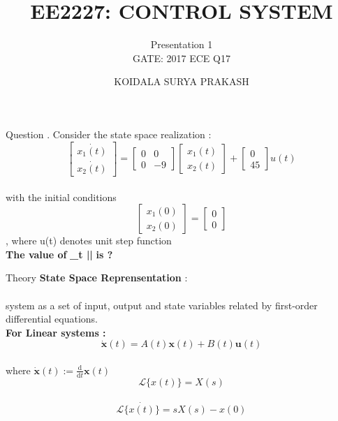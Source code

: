 \documentclass{beamer}
\title[ShortTitle]{EE2227: CONTROL SYSTEM}
\subtitle{Presentation 1 \\ GATE: 2017 ECE Q17 }\\
\author{KOIDALA SURYA PRAKASH}
\institute{EE18BTECH11026}
\date{\tomorrow}
\begin{document}
\begin{frame}
  \titlepage
\end{frame}

\begin{frame}{Question}
  \Q. Consider the state space realization : \vspace{2mm}\\
 $$\left[\begin{array}{l}
\dot{x_{1}(t)} \\
\dot{x_{2}(t)}
\end{array}\right]=\left[\begin{array}{cc}
{0} & {0} \\
{0} & {-9}
\end{array}\right]\left[\begin{array}{l}
{x_{1}(t)} \\
{x_{2}(t)}
\end{array}\right]+\left[\begin{array}{c}
{0} \\
{45}
\end{array}\right] u(t)$$ \smallskip  \\
with the initial conditions $$\left[\begin{array}{l}
{x_{1}(0)} \\
{x_{2}(0)}
\end{array}\right]=\left[\begin{array}{l}
{0} \\
{0}
\end{array}\right] $$, where u(t) denotes unit step function  \vspace{2mm} \\
\textbf { The value of } \textbf{\lim _{t \rightarrow \infty}||} \textbf { is ? }

\end{frame}


\begin{frame}{Theory}
\textbf{State Space Reprensentation} : \\
\\system as a set of input, output and state variables related by first-order differential equations.
\\\textbf{For Linear systems : }
\\$$\dot{\mathbf{x}}(t)=A(t) \mathbf{x}(t)+B(t) \mathbf{u}(t)$$
\\ where $\dot{\mathbf{x}}(t):=\frac{\mathrm{d}}{\mathrm{d} t} \mathbf{x}(t)$
\\$$\mathscr{L}\{x(t)\}=X(s)$$
\\$$\mathscr{L}\{\dot{x(t)}\}=sX(s) - x(0)$$
\end{frame}
 
\end{document}
